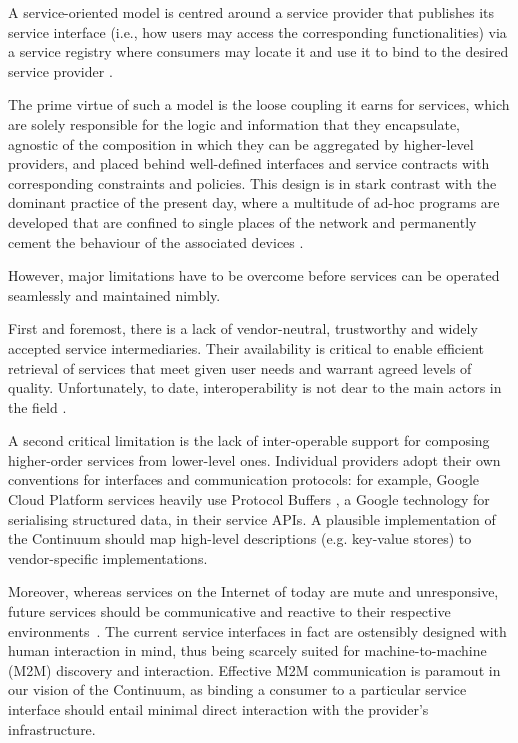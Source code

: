 A service-oriented model is centred around a service provider that publishes its service interface (i.e., how users may access the corresponding functionalities) via a service registry where consumers may locate it and use it to bind to the desired service provider \cite{haller2008internet}.

The prime virtue of such a model is the loose coupling it earns for services, which are solely responsible for the logic and information that they encapsulate, agnostic of the composition in which they can be aggregated by higher-level providers, and placed behind well-defined interfaces and service contracts with corresponding constraints and policies.
This design is in stark contrast with the dominant practice of the present day, where a multitude of ad-hoc programs are developed that are confined to single places of the network and permanently cement the behaviour of the associated devices \cite{beckman2020harnessing}.

However, major limitations have to be overcome before services can be operated seamlessly and maintained nimbly.  

First and foremost, there is a lack of vendor-neutral, trustworthy and widely accepted service intermediaries. Their availability is critical to enable efficient retrieval of services that meet given user needs and warrant agreed levels of quality. Unfortunately, to date, interoperability is not dear to the main actors in the field \textcolor{red}{\cite{grozev2014inter}}.

A second critical limitation is the lack of inter-operable support for composing higher-order services from lower-level ones. 
Individual providers adopt their own conventions for interfaces and communication protocols: for example, Google Cloud Platform services heavily use Protocol Buffers \cite{protobuf}, a Google technology for serialising structured data, in their service APIs. 
A plausible implementation of the Continuum should map high-level descriptions (e.g. key-value stores) to vendor-specific implementations.

Moreover, whereas services on the Internet of today are mute and unresponsive, future services should be communicative and reactive to their respective environments~\cite{haller2008internet}. 
The current service interfaces in fact are ostensibly designed with human interaction in mind, thus being scarcely suited for machine-to-machine (M2M) discovery and interaction. Effective M2M communication is paramout in our vision of the Continuum, as binding a consumer to a particular service interface should entail minimal direct interaction with the provider's infrastructure.


